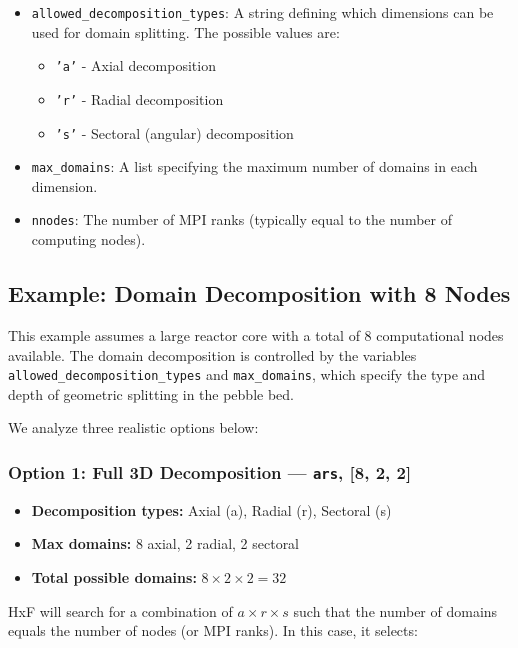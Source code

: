 \documentclass{article}
\begin{document}
\begin{itemize}
    \item \texttt{allowed\_decomposition\_types}: A string defining which dimensions can be used for domain splitting. The possible values are:
    \begin{itemize}
        \item \texttt{'a'} - Axial decomposition
        \item \texttt{'r'} - Radial decomposition
        \item \texttt{'s'} - Sectoral (angular) decomposition
    \end{itemize}
    \item \texttt{max\_domains}: A list specifying the maximum number of domains in each dimension.
    \item \texttt{nnodes}: The number of MPI ranks (typically equal to the number of computing nodes).
\end{itemize}

\subsection{Example: Domain Decomposition with 8 Nodes}

This example assumes a large reactor core with a total of 8 computational nodes available. The domain decomposition is controlled by the variables 
\texttt{allowed\_decomposition\_types} and \texttt{max\_domains}, which specify the type and depth of geometric splitting in the pebble bed.

We analyze three realistic options below:

\subsubsection*{Option 1: Full 3D Decomposition --- \texttt{ars}, [8, 2, 2]}

\begin{itemize}
    \item \textbf{Decomposition types:} Axial (a), Radial (r), Sectoral (s)
    \item \textbf{Max domains:} 8 axial, 2 radial, 2 sectoral
    \item \textbf{Total possible domains:} $8 \times 2 \times 2 = 32$
\end{itemize}

HxF will search for a combination of $a \times r \times s$ such that the number of domains equals the number of nodes (or MPI ranks). In this case, it selects:
\end{document}
